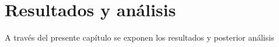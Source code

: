 
\chapter{Resultados y análisis}
\label{chp:resultados_analisis}
A través del presente capítulo se exponen los resultados y posterior análisis

%
%
%
%